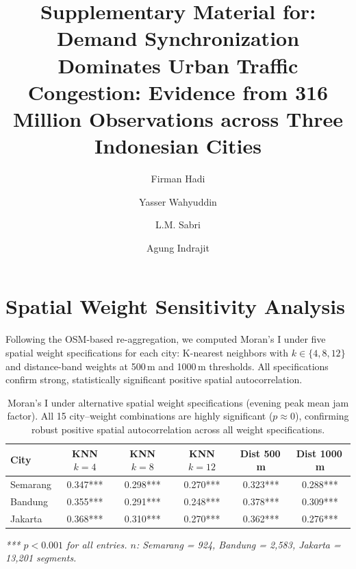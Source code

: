 \documentclass[preprint,12pt]{elsarticle}
\begin{document}
\begin{frontmatter}

\title{Supplementary Material for:\\
Demand Synchronization Dominates Urban Traffic Congestion: Evidence from 316 Million Observations across Three Indonesian Cities}

\author[undip]{Firman Hadi}
\author[undip]{Yasser Wahyuddin}
\author[undip]{L.M. Sabri}
\author[nca]{Agung Indrajit}



\end{frontmatter}

\setcounter{section}{0}
\renewcommand{\thesection}{S\arabic{section}}
\renewcommand{\thetable}{S\arabic{table}}
\renewcommand{\thefigure}{S\arabic{figure}}

\section{Spatial Weight Sensitivity Analysis}
\label{sec:s1}

Following the OSM-based re-aggregation, we computed Moran's I under five spatial weight specifications for each city: K-nearest neighbors with $k \in \{4, 8, 12\}$ and distance-band weights at 500\,m and 1000\,m thresholds. All specifications confirm strong, statistically significant positive spatial autocorrelation.

\begin{table}[!htbp]
\centering
\caption{Moran's I under alternative spatial weight specifications (evening peak mean jam factor). All 15 city--weight combinations are highly significant ($p \approx 0$), confirming robust positive spatial autocorrelation across all weight specifications.}
\label{tab:s1}
\begin{tabular}{lccccc}
\toprule
City & KNN $k{=}4$ & KNN $k{=}8$ & KNN $k{=}12$ & Dist 500\,m & Dist 1000\,m \\
\midrule
Semarang & 0.347*** & 0.298*** & 0.270*** & 0.323*** & 0.288*** \\
Bandung  & 0.355*** & 0.291*** & 0.248*** & 0.378*** & 0.309*** \\
Jakarta  & 0.368*** & 0.310*** & 0.270*** & 0.362*** & 0.276*** \\
\bottomrule
\end{tabular}

\smallskip
\noindent\textit{*** $p < 0.001$ for all entries. $n$: Semarang = 924, Bandung = 2,583, Jakarta = 13,201 segments.}
\end{table}
\end{document}
